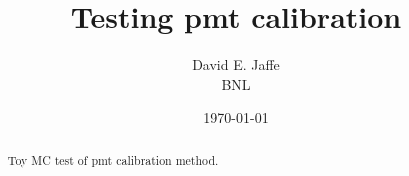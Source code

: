 \documentclass[12pt]{article}
\begin{document}
\title{Testing pmt calibration}

\author{David E. Jaffe \\ BNL}
\date{\today}
\maketitle
\begin{abstract}
{
Toy MC test of pmt calibration method.
}
\end{abstract}


\onehalfspacing   %




\end{document}
